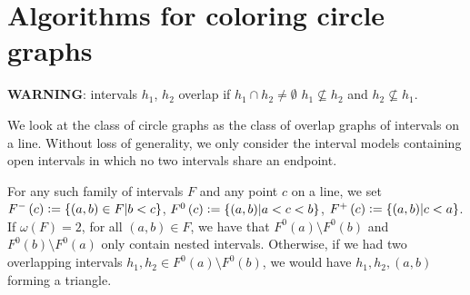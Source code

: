 \documentclass[12pt]{article}
\theoremstyle{definition}
\newcommand{\defeq}{\vcentcolon=}
\begin{document}
    \section{Algorithms for coloring circle graphs}
    
    \textbf{WARNING}: intervals
    $h_1$, $h_2$ overlap if
    $h_1 \cap h_2 \neq \emptyset$
    $h_1 \not \subseteq h_2$ and
    $h_2 \not \subseteq h_1$.
    \vspace{4pt}

    We look at the class
    of circle graphs as the class
    of overlap graphs of intervals on a line.
    Without loss of generality,
    we only consider the interval
    models containing open intervals
    in which no two intervals
    share an endpoint.

    For any such family of intervals
    $F$ and any point $c$ on a line,
    we set $F^{-}\left(c\right) \defeq
    \left\{\left(a, b\right) \in F
    \middle| b < c\right\}$,
    $F^{0}\left(c\right) \defeq
    \left\{\left(a, b\right)
    \middle| a < c < b\right\}$,
    $F^{+}\left(c\right) \defeq
    \left\{\left(a, b\right)
    \middle| c < a\right\}$.
    If $\omega\left(F\right) = 2$,
    for all $\left(a, b\right) \in F$,
    we have that
    $F^{0}\left(a\right) \setminus F^{0}\left(b\right)$ 
    and $F^{0}\left(b\right) \setminus F^{0}\left(a\right)$
    only contain nested intervals.
    Otherwise, if we had two
    overlapping intervals $h_1, h_2 \in
    F^{0}\left(a\right) \setminus F^{0}\left(b\right)$,
    we would have $h_1, h_2, \left(a, b\right)$ 
    forming a triangle.
\end{document}
